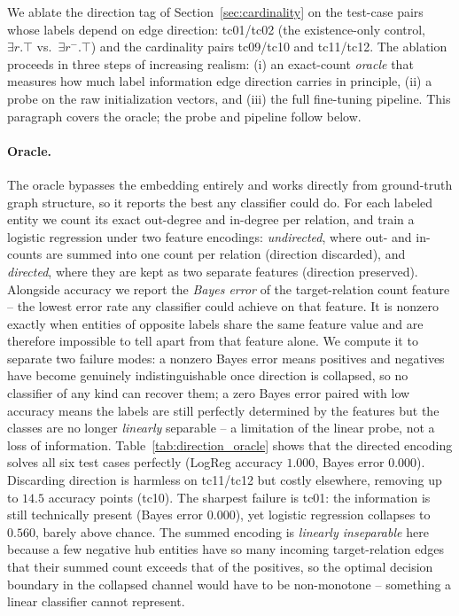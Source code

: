 \documentclass[a4paper,oneside,bibliography=totoc]{scrbook}
\begin{document}
We ablate the direction tag of Section~\ref{sec:cardinality} on the test-case
pairs whose labels depend on edge direction: tc01/tc02 (the existence-only
control, $\exists r.\top$ vs.\ $\exists r^{-}.\top$) and the cardinality pairs
tc09/tc10 and tc11/tc12. The ablation proceeds in three steps of increasing
realism: (i) an exact-count \emph{oracle} that measures how much label
information edge direction carries in principle, (ii) a probe on the raw
initialization vectors, and (iii) the full fine-tuning pipeline. This paragraph
covers the oracle; the probe and pipeline follow below.

\paragraph{Oracle.} The oracle bypasses the embedding entirely and works
directly from ground-truth graph structure, so it reports the best any
classifier could do. For each labeled entity we count its exact out-degree and
in-degree per relation, and train a logistic regression under two feature
encodings: \emph{undirected}, where out- and in-counts are summed into one
count per relation (direction discarded), and \emph{directed}, where they are
kept as two separate features (direction preserved). Alongside accuracy we
report the \emph{Bayes error} of the target-relation count feature -- the
lowest error rate any classifier could achieve on that feature. It is nonzero
exactly when entities of opposite labels share the same feature value and are
therefore impossible to tell apart from that feature alone. We compute it to
separate two failure modes: a nonzero Bayes error means positives and negatives
have become genuinely indistinguishable once direction is collapsed, so no
classifier of any kind can recover them; a zero Bayes error paired with low
accuracy means the labels are still perfectly determined by the features but the
classes are no longer \emph{linearly} separable -- a limitation of the linear
probe, not a loss of information.
Table~\ref{tab:direction_oracle} shows that the directed encoding solves all
six test cases perfectly (LogReg accuracy $1.000$, Bayes error $0.000$).
Discarding direction is harmless on tc11/tc12 but costly elsewhere, removing up
to $14.5$ accuracy points (tc10). The sharpest failure is tc01: the information
is still technically present (Bayes error $0.000$), yet logistic regression
collapses to $0.560$, barely above chance. The summed encoding is \emph{linearly
inseparable} here because a few negative hub entities have so many incoming
target-relation edges that their summed count exceeds that of the positives, so
the optimal decision boundary in the collapsed channel would have to be
non-monotone -- something a linear classifier cannot represent.
\end{document}
